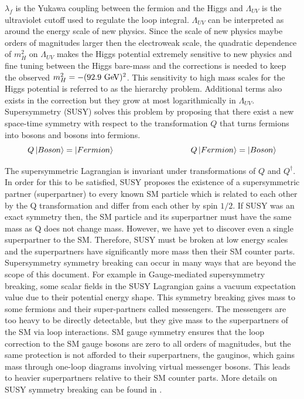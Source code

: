 \indent $\lambda_f$ is the Yukawa coupling between the fermion and the Higgs and $\Lambda_{UV}$ is the ultraviolet cutoff used to regulate the loop integral.  $\Lambda_{UV}$ can be interpreted as around the energy scale of new physics.  Since the scale of new physics maybe orders of magnitudes larger then the electroweak scale, the quadratic dependence of $m_H^2$ on $\Lambda_{UV}$ makes the Higgs potential extremely sensitive to new physics and fine tuning between the Higgs bare-mass and the corrections is needed to keep the observed $m_H^2 = -(92.9 \gev)^2$.  This sensitivity to high mass scales for the Higgs potential is referred to as the hierarchy problem.  Additional terms also exists in the correction but they grow at most logarithmically in $\Lambda_{UV}$. \\

\indent Supersymmetry (SUSY) solves this problem by proposing that there exist a new space-time symmetry with respect to the transformation $Q$ that turns fermions into bosons and bosons into fermions.\\

\begin{equation}
\label{eqn:Higgs:Loopf}
Q\ket{Boson} = \ket{Fermion} ~~~~~~~~~~~~~~~~~~~~~~~~~~~~ Q\ket{Fermion} = \ket{Boson}
\end{equation}

\indent The supersymmetric Lagrangian is invariant under transformations of $Q$ and $Q^{\dagger}$.  In order for this to be satisfied, SUSY proposes the existence of a supersymmetric partner (superpartner) to every known SM particle which is related to each other by the Q transformation and differ from each other by spin $1/2$.  If SUSY was an exact symmetry then, the SM particle and its superpartner must have the same mass as Q does not change mass.  However, we have yet to discover even a single superpartner to the SM.  Therefore, SUSY must be broken at low energy scales and the superpartners have significantly more mass then their SM counter parts.  \\

\indent Supersymmetry symmetry breaking can occur in many ways that are beyond the scope of this document.  For example in Gauge-mediated supersymmetry breaking, some scalar fields in the SUSY Lagrangian gains a vacuum expectation value due to their potential energy shape.  This symmetry breaking gives mass to some fermions and their super-partners called messengers.  The messengers are too heavy to be directly detectable, but they give mass to the superpartners of the SM via loop interactions.  SM gauge symmetry ensures that the loop correction to the SM gauge bosons are zero to all orders of magnitudes, but the same protection is not afforded to their superpartners, the gauginos, which gains mass through one-loop diagrams involving virtual messenger bosons.  This leads to heavier superpartners relative to their SM counter parts.  More details on SUSY symmetry breaking can be found in \cite{MartinSUSY}. \\

